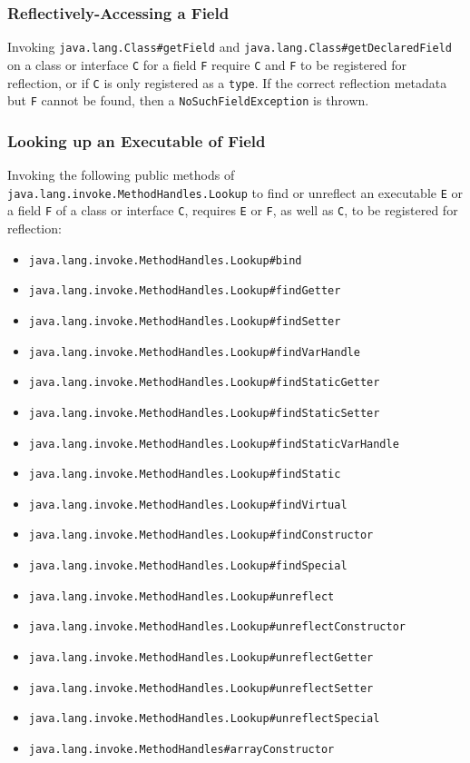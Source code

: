 \subsubsection{Reflectively-Accessing a Field}

Invoking \texttt{java.lang.Class\#getField} and \texttt{java.lang.Class\#getDeclaredField} on a class or interface \verb|C| for a field \verb|F| require \verb|C| and \verb|F| to be registered for reflection, or if \verb|C| is only registered as a \texttt{type}. If the correct reflection metadata but \verb|F| cannot be found, then a \texttt{NoSuchFieldException} is thrown.

\subsubsection{Looking up an Executable of Field}

Invoking the following public methods of \texttt{java.lang.invoke.MethodHandles.Lookup} to find or unreflect an executable \verb|E| or a field \verb|F| of a class or interface \verb|C|, requires \verb|E| or \verb|F|, as well as \verb|C|, to be registered for reflection: 

\begin{itemize}
    \item \texttt{java.lang.invoke.MethodHandles.Lookup\#bind} 
    \item \texttt{java.lang.invoke.MethodHandles.Lookup\#findGetter} 
    \item \texttt{java.lang.invoke.MethodHandles.Lookup\#findSetter} 
    \item \texttt{java.lang.invoke.MethodHandles.Lookup\#findVarHandle} 
    \item \texttt{java.lang.invoke.MethodHandles.Lookup\#findStaticGetter} 
    \item \texttt{java.lang.invoke.MethodHandles.Lookup\#findStaticSetter} 
    \item \texttt{java.lang.invoke.MethodHandles.Lookup\#findStaticVarHandle} 
    \item \texttt{java.lang.invoke.MethodHandles.Lookup\#findStatic} 
    \item \texttt{java.lang.invoke.MethodHandles.Lookup\#findVirtual} 
    \item \texttt{java.lang.invoke.MethodHandles.Lookup\#findConstructor} 
    \item \texttt{java.lang.invoke.MethodHandles.Lookup\#findSpecial} 
    \item \texttt{java.lang.invoke.MethodHandles.Lookup\#unreflect} 
    \item \texttt{java.lang.invoke.MethodHandles.Lookup\#unreflectConstructor} 
    \item \texttt{java.lang.invoke.MethodHandles.Lookup\#unreflectGetter} 
    \item \texttt{java.lang.invoke.MethodHandles.Lookup\#unreflectSetter} 
    \item \texttt{java.lang.invoke.MethodHandles.Lookup\#unreflectSpecial} 
    \item \texttt{java.lang.invoke.MethodHandles\#arrayConstructor}
\end{itemize}

